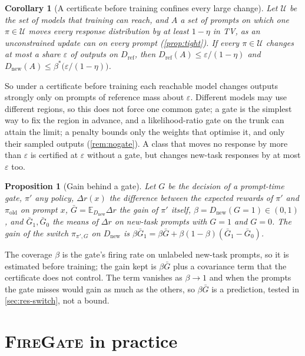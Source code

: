 \documentclass{article}
\theoremstyle{plain}
\newtheorem{proposition}[theorem]{Proposition}
\newtheorem{corollary}[theorem]{Corollary}
\theoremstyle{definition}
\theoremstyle{remark}
\newcommand{\E}{\mathbb{E}}
\newcommand{\Dref}{D_{\mathrm{ref}}}
\newcommand{\Dnew}{D_{\mathrm{new}}}
\newcommand{\pold}{\pi_{\mathrm{old}}}
\newcommand{\method}{\textsc{FireGate}}
\begin{document}
\begin{corollary}[A certificate before training confines every large change]
\label{cor:gate}
Let $\mathcal U$ be the set of models that training can reach, and $A$ a set of prompts on which one $\pi\in\mathcal U$
moves every response distribution by at least $1-\eta$ in TV, as an unconstrained update can on every prompt
(\cref{prop:tight}). If every $\pi\in\mathcal U$ changes at most a share $\varepsilon$ of outputs on $\Dref$, then
$\Dref(A)\le\varepsilon/(1-\eta)$ and $\Dnew(A)\le\beta^\ast\big(\varepsilon/(1-\eta)\big)$.
\end{corollary}

So under a certificate before training each reachable model changes outputs strongly only on prompts of reference
mass about $\varepsilon$. Different models may use different regions, so this does not force one common gate; a gate
is the simplest way to fix the region in advance, and a likelihood-ratio gate on the trunk can attain the limit; a penalty bounds only the weights that
optimise it, and only their sampled outputs (\cref{rem:nogate}). A class that moves no response by more than $\varepsilon$ is
certified at $\varepsilon$ without a gate, but changes new-task responses by at most $\varepsilon$ too.

\begin{proposition}[Gain behind a gate]
\label{prop:switchgain}
Let $G$ be the decision of a prompt-time gate, $\pi'$ any policy, $\Delta r(x)$ the difference between the expected rewards of $\pi'$
and $\pold$ on prompt $x$, $\bar G=\E_{\Dnew}\Delta r$ the gain of $\pi'$ itself, $\beta=\Dnew(G=1)\in(0,1)$, and $\bar
G_1,\bar G_0$ the means of $\Delta r$ on new-task prompts with $G=1$ and $G=0$. The gain of the switch $\pi_{\pi',G}$
on $\Dnew$ is $\beta\bar G_1=\beta\bar G+\beta(1-\beta)(\bar G_1-\bar G_0)$.
\end{proposition}

The coverage $\beta$ is the gate's firing rate on unlabeled new-task prompts, so it is estimated before training;
the gain kept is $\beta\bar G$ plus a covariance term that the certificate does not control. The term vanishes as
$\beta\to1$ and when the prompts the gate misses would gain as much as the others, so $\beta\bar G$ is a prediction, tested in \cref{sec:res-switch}, not a bound.

\section{\method{} in practice}
\label{sec:method}
\end{document}
